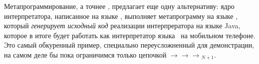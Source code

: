 \bigskip
Метапрограммирование, а точнее , предлагает еще одну
альтернативу: ядро интерпретатора, написанное на языке \py, выполняет
метапрограмму на языке \hico, который \emph{генерирует исходный код} реализации
интерпрератора на языке Java, которое в итоге будет работать как интерпретатор языка \F\ на
мобильном телефоне. Это самый обкуренный пример, специально переусложненный
для демонстрации, на самом деле бы пока ограничимся только цепочкой
\py$\rightarrow$\hico$\rightarrow$\py$\rightarrow$\hico$_{N+1}$.

\secup